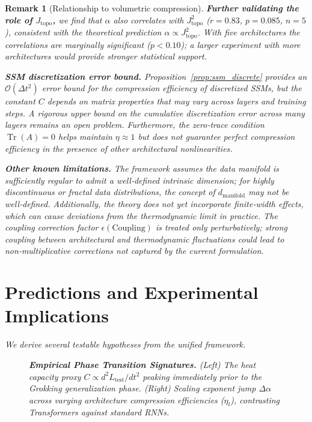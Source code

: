 \documentclass[11pt, a4paper]{article}
\theoremstyle{plain}
\newtheorem*{remark}{Remark}
\DeclareMathOperator{\Tr}{Tr}
\begin{document}
\begin{remark}[Relationship to volumetric compression]
\bigskip
\noindent\textbf{Further validating the role of $J_{\mathrm{topo}}$,} we find that $\alpha$ also correlates with $J_{\mathrm{topo}}^2$ ($r = 0.83$, $p = 0.085$, $n=5$), consistent with the theoretical prediction $\alpha \propto J_{\mathrm{topo}}^2$. With five architectures the correlations are marginally significant ($p < 0.10$); a larger experiment with more architectures would provide stronger statistical support.

\textbf{SSM discretization error bound.} Proposition~\ref{prop:ssm_discrete} provides an $\mathcal{O}(\Delta t^2)$ error bound for the compression efficiency of discretized SSMs, but the constant $C$ depends on matrix properties that may vary across layers and training steps. A rigorous upper bound on the cumulative discretization error across many layers remains an open problem. Furthermore, the zero‑trace condition $\Tr(A)=0$ helps maintain $\eta\approx1$ but does not guarantee perfect compression efficiency in the presence of other architectural nonlinearities.

\textbf{Other known limitations.} The framework assumes the data manifold is sufficiently regular to admit a well‑defined intrinsic dimension; for highly discontinuous or fractal data distributions, the concept of $d_{\text{manifold}}$ may not be well‑defined. Additionally, the theory does not yet incorporate finite‑width effects, which can cause deviations from the thermodynamic limit in practice. The coupling correction factor $\epsilon(\text{Coupling})$ is treated only perturbatively; strong coupling between architectural and thermodynamic fluctuations could lead to non‑multiplicative corrections not captured by the current formulation.

\section{Predictions and Experimental Implications}

We derive several testable hypotheses from the unified framework.

\begin{figure}[htbp]
    \centering
    \vspace{4cm} %
    \caption{\textbf{Empirical Phase Transition Signatures.} (Left) The heat capacity proxy $C \propto d^2L_{\text{test}}/dt^2$ peaking immediately prior to the Grokking generalization phase. (Right) Scaling exponent jump $\Delta\alpha$ across varying architecture compression efficiencies ($\eta_l$), contrasting Transformers against standard RNNs.}
    \label{fig:empirical_validation}
\end{figure}


\end{remark}
\end{document}
